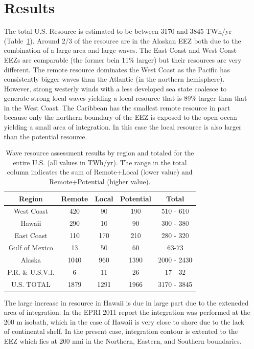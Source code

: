 \section{Results}

The total U.S. Resource is estimated to be between 3170 and 3845 TWh/yr (Table~\ref{table:totals}). Around 2/3 of the resource are in the Alaskan EEZ both due to the combination of a large area and large waves. The East Coast and West Coast EEZs are comparable (the former bein 11\% larger) but their resources are very different. The remote resource dominates the West Coast as the Pacific has consistently bigger waves than the Atlantic (in the northern hemisphere). However, strong westerly winds with a less developed sea state coalesce to generate strong local waves yielding a local resource that is 89\% larger than that in the West Coast.  The Caribbean has the smallest remote resource in part because only the northern boundary of the EEZ is exposed to the open ocean yielding a small area of integration. In this case the local resource is also larger than the potential resource. 

\begin{table}[ht]
  \centering
  \begin{tabular}{|c|c|c|c|c|}
    \hline
    Region & Remote & Local & Potential & Total \\
    \hline
    West Coast & 420 & 90 & 190 & 510 - 610 \\
    Hawaii & 290 & 10 & 90 & 300 - 380 \\
    East Coast & 110 & 170 & 210 & 280 - 320 \\
    Gulf of Mexico & 13 & 50 & 60 & 63-73 \\
    Alaska & 1040 & 960 & 1390 & 2000 - 2430 \\
    P.R. \& U.S.V.I. & 6 & 11 & 26 & 17 - 32 \\
    \hline \hline
U.S. TOTAL & 1879 & 1291 & 1966 & 3170 - 3845 \\
\hline
  \end{tabular}
  \caption{Wave resource assessment results by region and totaled for the entire U.S. (all values in TWh/yr). The range in the total column indicates the sum of Remote+Local (lower value) and Remote+Potential (higher value). }
  \label{table:totals}
\end{table}

The large increase in resource in Hawaii is due in large part due to the exteneded area of integration. In the EPRI 2011 report the integration was performed at the 200 m isobath, which in the case of Hawaii is very close to shore due to the lack of continental shelf. In the present case, integration contour is extented to the EEZ which lies at 200 nmi in the Northern, Eastern, and Southern boundaries.

